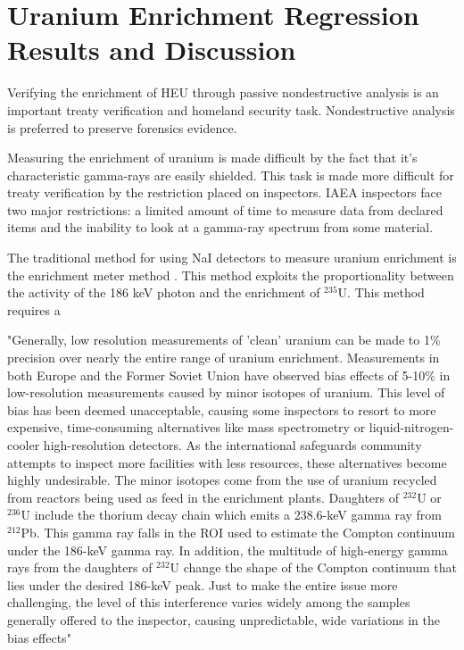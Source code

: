 \chapter{Uranium Enrichment Regression Results and Discussion}



Verifying the enrichment of HEU through passive nondestructive analysis is an important treaty verification and homeland security task. Nondestructive analysis is preferred to preserve forensics evidence. 

Measuring the enrichment of uranium is made difficult by the fact that it's characteristic gamma-rays are easily shielded. This task is made more difficult for treaty verification by the restriction placed on inspectors. IAEA inspectors face two major restrictions: a limited amount of time to measure data from declared items and the inability to look at a gamma-ray spectrum from some material. 

The traditional method for using NaI detectors to measure uranium enrichment is the enrichment meter method \cite{Reilly1970}. This method exploits the proportionality between the activity of the 186 keV photon and the enrichment of $^{235}$U. This method requires a 

"Generally, low resolution measurements of 'clean' uranium can be made to 1\% precision over nearly the entire range of uranium enrichment. Measurements in both Europe and the Former Soviet Union have observed bias effects of 5-10\% in low-resolution measurements caused by minor isotopes of uranium. This level of bias has been deemed unacceptable, causing some inspectors to resort to more expensive, time-consuming alternatives like mass spectrometry or liquid-nitrogen-cooler high-resolution detectors. As the international safeguards community attempts to inspect more facilities with less resources, these alternatives become highly undesirable. The minor isotopes come from the use of uranium recycled from reactors being used as feed in the enrichment plants. Daughters of $^{232}$U or $^{236}$U include the thorium decay chain which emits a 238.6-keV gamma ray from $^{212}$Pb. This gamma ray falls in the ROI used to estimate the Compton continuum under the 186-keV gamma ray. In addition, the multitude of high-energy gamma rays from the daughters of $^{232}$U change the shape of the Compton continuum that lies under the desired 186-keV peak. Just to make the entire issue more challenging, the level of this interference varies widely among the samples generally offered to the inspector, causing unpredictable, wide variations in the bias effects" \cite{SPRINKLE1997}



